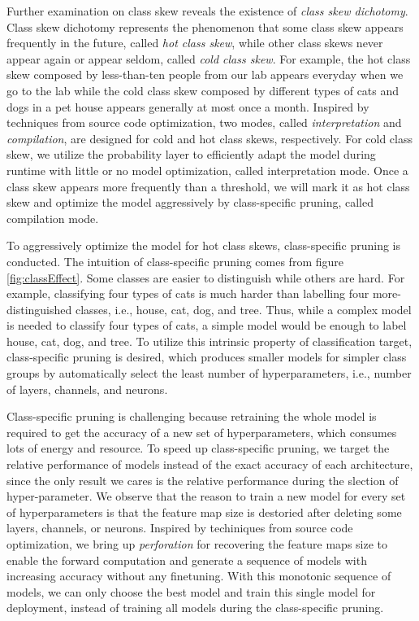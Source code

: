 \documentclass[pageno]{jpaper}
\begin{document}
Further examination on class skew reveals the existence of \textit{class skew dichotomy}. Class skew dichotomy represents the phenomenon that some class skew appears frequently in the future, called \textit{hot class skew}, while other class skews never appear again or appear seldom, called \textit{cold class skew}. For example, the hot class skew composed by less-than-ten people from our lab appears everyday when we go to the lab while the cold class skew composed by different types of cats and dogs in a pet house appears generally at most once a month. Inspired by techniques from source code optimization, two modes, called \textit{interpretation} and \textit{compilation}, are designed for cold and hot class skews, respectively. For cold class skew, we utilize the probability layer to efficiently adapt the model during runtime with little or no model optimization, called interpretation mode. Once a class skew appears more frequently than a threshold, we will mark it as hot class skew and optimize the model aggressively by class-specific pruning, called compilation mode. 


To aggressively optimize the model for hot class skews, class-specific pruning is conducted. The intuition of class-specific pruning comes from figure \ref{fig:classEffect}. Some classes are easier to distinguish while others are hard. For example, classifying four types of cats is much harder than labelling four more-distinguished classes, i.e., house, cat, dog, and tree. Thus, while a complex model is needed to classify four types of cats, a simple model would be enough to label house, cat, dog, and tree. To utilize this intrinsic property of classification target, class-specific pruning is desired, which produces smaller models for simpler class groups by automatically select the least number of hyperparameters, i.e., number of layers, channels, and neurons. 

Class-specific pruning is challenging because retraining the whole model is required to get the accuracy of a new set of hyperparameters, which consumes lots of energy and resource. To speed up class-specific pruning, we target the relative performance of models instead of the exact accuracy of each architecture, since the only result we cares is the relative performance during the slection of hyper-parameter. We observe that the reason to train a new model for every set of hyperparameters is that the feature map size is destoried after deleting some layers, channels, or neurons. Inspired by techiniques from source code optimization, we bring up \textit{perforation} for recovering the feature maps size to enable the forward computation and generate a sequence of models with increasing accuracy without any finetuning. With this monotonic sequence of models, we can only choose the best model and train this single model for deployment, instead of training all models during the class-specific pruning.
\end{document}
